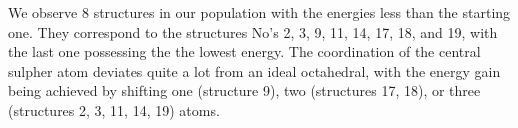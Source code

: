 \documentclass[preprint,review,12pt]{elsarticle}
\begin{document}
We observe 8 structures in our population with the energies less than the starting one.
They correspond to the structures No's 2, 3, 9, 11, 14, 17, 18, and 19, with the last one  possessing the the lowest energy.
The coordination of the central sulpher atom deviates quite a lot from an ideal octahedral, with the energy gain being achieved by shifting one (structure 9), two (structures 17, 18), or three (structures 2, 3, 11, 14, 19) atoms.

%

\begin{table}
\caption{\label{tab:energy}%
The difference between the reference structure energy, and the unit cell energy of tennantite with different Laves \textcolor{red}{polyhedra}.
}
\centering
{}
\end{table}
\end{document}
